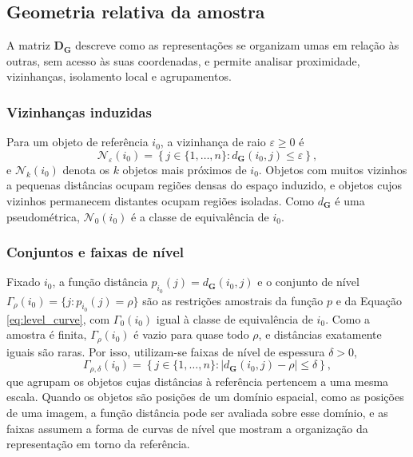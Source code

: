 \subsection{Geometria relativa da amostra}
\label{subsec:sample_relative_geometry}

A matriz $\mathbf{D}_{\mathbf{G}}$ descreve como as representações se organizam umas em relação às outras, sem acesso às suas coordenadas, e permite analisar proximidade, vizinhanças, isolamento local e agrupamentos.

\subsubsection*{Vizinhanças induzidas}

Para um objeto de referência $i_0$, a vizinhança de raio $\varepsilon\geq 0$ é
\begin{equation}\label{eq:epsilon_neighborhood}
    \mathcal{N}_{\varepsilon}(i_0) = \left\{ j\in\{1,\dots,n\} : d_{\mathbf{G}}(i_0,j) \leq \varepsilon \right\},
\end{equation}
e $\mathcal{N}_k(i_0)$ denota os $k$ objetos mais próximos de $i_0$. Objetos com muitos vizinhos a pequenas distâncias ocupam regiões densas do espaço induzido, e objetos cujos vizinhos permanecem distantes ocupam regiões isoladas. Como $d_{\mathbf{G}}$ é uma pseudométrica, $\mathcal{N}_0(i_0)$ é a classe de equivalência de $i_0$.

\subsubsection*{Conjuntos e faixas de nível}

Fixado $i_0$, a função distância $p_{i_0}(j) = d_{\mathbf{G}}(i_0,j)$ e o conjunto de nível $\Gamma_\rho(i_0) = \{ j : p_{i_0}(j) = \rho \}$ são as restrições amostrais da função $p$ e da Equação \eqref{eq:level_curve}, com $\Gamma_0(i_0)$ igual à classe de equivalência de $i_0$. Como a amostra é finita, $\Gamma_\rho(i_0)$ é vazio para quase todo $\rho$, e distâncias exatamente iguais são raras. Por isso, utilizam-se faixas de nível de espessura $\delta>0$,
\begin{equation}\label{eq:sample_level_band}
    \Gamma_{\rho,\delta}(i_0) = \left\{ j\in\{1,\dots,n\} : \left| d_{\mathbf{G}}(i_0,j)-\rho \right| \leq\delta \right\},
\end{equation}
que agrupam os objetos cujas distâncias à referência pertencem a uma mesma escala. Quando os objetos são posições de um domínio espacial, como as posições de uma imagem, a função distância pode ser avaliada sobre esse domínio, e as faixas assumem a forma de curvas de nível que mostram a organização da representação em torno da referência.

